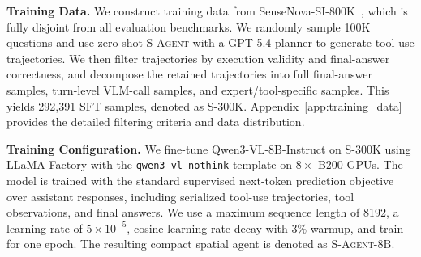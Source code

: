 \documentclass{llmxive}
\begin{document}
\textbf{Training Data.}
We construct training data from SenseNova-SI-800K~\citep{sensenova_si}, which is fully disjoint from all evaluation benchmarks. 
We randomly sample 100K questions and use zero-shot \textsc{S-Agent} with a GPT-5.4 planner to generate tool-use trajectories.
We then filter trajectories by execution validity and final-answer correctness, and decompose the retained trajectories into full final-answer samples, turn-level VLM-call samples, and expert/tool-specific samples. 
This yields 292,391 SFT samples, denoted as \textsc{S-300K}. 
Appendix~\ref{app:training_data} provides the detailed filtering criteria and data distribution.

\textbf{Training Configuration.}
We fine-tune Qwen3-VL-8B-Instruct on \textsc{S-300K} using LLaMA-Factory \citep{zheng2024llamafactory} with the \texttt{qwen3\_vl\_nothink} template on $8\times$ B200 GPUs. 
The model is trained with the standard supervised next-token prediction objective over assistant responses, including serialized tool-use trajectories, tool observations, and final answers. 
We use a maximum sequence length of 8192, a learning rate of $5\times10^{-5}$, cosine learning-rate decay with 3\% warmup, and train for one epoch. 
The resulting compact spatial agent is denoted as \textsc{S-Agent-8B}.
\end{document}

